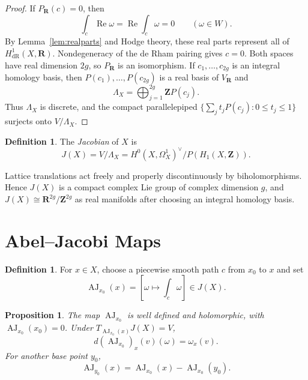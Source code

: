 \documentclass[11pt]{article}
\numberwithin{equation}{section}
\newtheorem{proposition}[theorem]{Proposition}
\theoremstyle{definition}
\newtheorem{definition}[theorem]{Definition}
\newcommand{\Z}{\mathbf Z}
\newcommand{\R}{\mathbf R}
\newcommand{\AJ}{\operatorname{AJ}}
\newcommand{\dR}{\mathrm{dR}}
\begin{document}
\begin{proof}
If $P_{\R}(c)=0$, then
\[
 \int_c\operatorname{Re}\omega
 =\operatorname{Re}\int_c\omega=0\qquad(\omega\in W).
\]
By Lemma~\ref{lem:realparts} and Hodge theory, these real parts represent
all of $H^1_{\dR}(X,\R)$. Nondegeneracy of the de Rham pairing gives
$c=0$. Both spaces have real dimension $2g$, so $P_{\R}$ is an
isomorphism. If $c_1,\ldots,c_{2g}$ is an integral homology basis, then
$P(c_1),\ldots,P(c_{2g})$ is a real basis of $V_{\R}$ and
\[
 \Lambda_X=\bigoplus_{j=1}^{2g}\Z P(c_j).
\]
Thus $\Lambda_X$ is discrete, and the compact parallelepiped
$\{\sum_jt_jP(c_j):0\leq t_j\leq1\}$ surjects onto $V/\Lambda_X$.
\end{proof}

\begin{definition}
The \emph{Jacobian} of $X$ is
\begin{equation}\label{eq:jacobian}
 J(X)=V/\Lambda_X
 =H^0(X,\Omega_X^1)^\vee/P(H_1(X,\Z)).
\end{equation}
\end{definition}

Lattice translations act freely and properly discontinuously by
biholomorphisms. Hence $J(X)$ is a compact complex Lie group of complex
dimension $g$, and $J(X)\cong\R^{2g}/\Z^{2g}$ as real manifolds after
choosing an integral homology basis.

\section{Abel--Jacobi Maps}

\begin{definition}
For $x\in X$, choose a piecewise smooth path $c$ from $x_0$ to $x$ and set
\begin{equation}\label{eq:aj}
 \AJ_{x_0}(x)=\left[\omega\longmapsto\int_c\omega\right]\in J(X).
\end{equation}
\end{definition}

\begin{proposition}\label{prop:aj}
The map $\AJ_{x_0}$ is well defined and holomorphic, with
$\AJ_{x_0}(x_0)=0$. Under $T_{\AJ_{x_0}(x)}J(X)=V$,
\begin{equation}\label{eq:daj}
 d(\AJ_{x_0})_x(v)(\omega)=\omega_x(v).
\end{equation}
For another base point $y_0$,
\[
 \AJ_{y_0}(x)=\AJ_{x_0}(x)-\AJ_{x_0}(y_0).
\]
\end{proposition}
\end{document}
